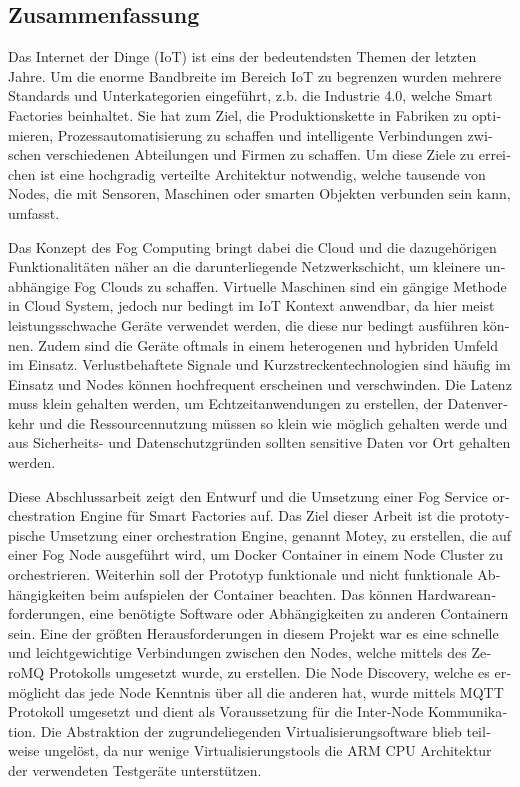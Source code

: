 \begin{otherlanguage}{ngerman}
\chapter*{Zusammenfassung}\label{chapter:zusammenfassung}
Das Internet der Dinge (\acs{IoT}) ist eins der bedeutendsten Themen der letzten Jahre.
Um die enorme Bandbreite im Bereich \acs{IoT} zu begrenzen wurden mehrere Standards und Unterkategorien eingeführt, z.b. die Industrie 4.0, welche Smart Factories beinhaltet.
Sie hat zum Ziel, die Produktionskette in Fabriken zu optimieren, Prozessautomatisierung zu schaffen und intelligente Verbindungen zwischen verschiedenen Abteilungen und Firmen zu schaffen.
Um diese Ziele zu erreichen ist eine hochgradig verteilte Architektur notwendig, welche tausende von Nodes, die mit Sensoren, Maschinen oder smarten Objekten verbunden sein kann, umfasst.

Das Konzept des Fog Computing bringt dabei die Cloud und die dazugehörigen Funktionalitäten näher an die darunterliegende Netzwerkschicht, um kleinere unabhängige Fog Clouds zu schaffen.
Virtuelle Maschinen sind ein gängige Methode in Cloud System, jedoch nur bedingt im \ac{IoT} Kontext anwendbar, da hier meist leistungsschwache Geräte verwendet werden, die diese nur bedingt ausführen können.
Zudem sind die Geräte oftmals in einem heterogenen und hybriden Umfeld im Einsatz.
Verlustbehaftete Signale und Kurzstreckentechnologien sind häufig im Einsatz und Nodes können hochfrequent erscheinen und verschwinden.
Die Latenz muss klein gehalten werden, um Echtzeitanwendungen zu erstellen, der Datenverkehr und die Ressourcennutzung müssen so klein wie möglich gehalten werde und aus Sicherheits- und Datenschutzgründen sollten sensitive Daten vor Ort gehalten werden.

Diese Abschlussarbeit zeigt den Entwurf und die Umsetzung einer Fog Service orchestration Engine für Smart Factories auf.
Das Ziel dieser Arbeit ist die prototypische Umsetzung einer orchestration Engine, genannt Motey, zu erstellen, die auf einer Fog Node ausgeführt wird, um Docker Container in einem Node Cluster zu orchestrieren.
Weiterhin soll der Prototyp funktionale und nicht funktionale Abhängigkeiten beim aufspielen der Container beachten.
Das können Hardwareanforderungen, eine benötigte Software oder Abhängigkeiten zu anderen Containern sein.
Eine der größten Herausforderungen in diesem Projekt war es eine schnelle und leichtgewichtige Verbindungen zwischen den Nodes, welche mittels des ZeroMQ Protokolls umgesetzt wurde, zu erstellen.
Die Node Discovery, welche es ermöglicht das jede Node Kenntnis über all die anderen hat, wurde mittels \acs{MQTT} Protokoll umgesetzt und dient als Voraussetzung für die Inter-Node Kommunikation.
Die Abstraktion der zugrundeliegenden Virtualisierungsoftware blieb teilweise ungelöst, da nur wenige Virtualisierungstools die ARM \acs{CPU} Architektur der verwendeten Testgeräte unterstützen.


\end{otherlanguage}
